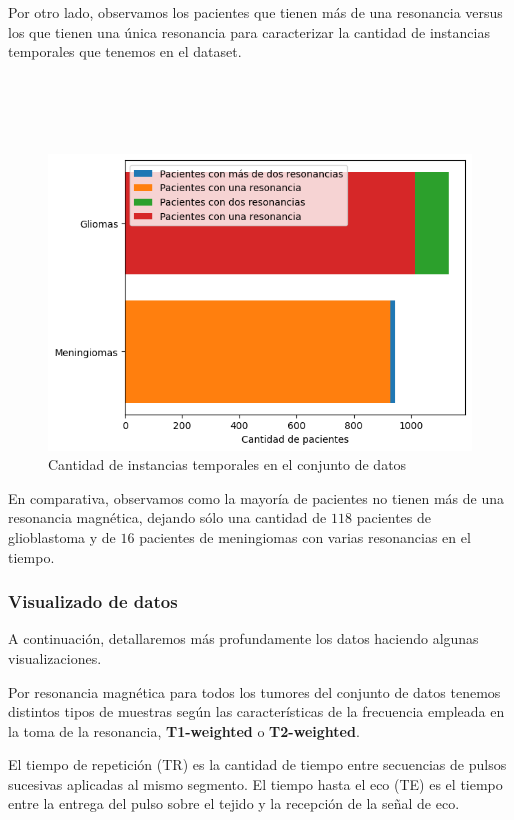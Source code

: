 Por otro lado, observamos los pacientes que tienen más de una resonancia versus los que tienen una única resonancia para caracterizar la cantidad de instancias temporales que tenemos en el dataset.
\\
\\
\\
\\
\\

\begin{figure}[!h]
	\centering
	\includegraphics[width=0.8\linewidth]{imagenes/cantidadinstanciastemporales.png}
	\caption{Cantidad de instancias temporales en el conjunto de datos}
\end{figure}

En comparativa, observamos como la mayoría de pacientes no tienen más de una resonancia magnética, dejando sólo una cantidad de $118$ pacientes de glioblastoma y de $16$ pacientes de meningiomas con varias resonancias en el tiempo.

\subsubsection{Visualizado de datos}

A continuación, detallaremos más profundamente los datos haciendo algunas visualizaciones. 

Por resonancia magnética para todos los tumores del conjunto de datos tenemos distintos tipos de muestras según las características de la frecuencia empleada en la toma de la resonancia, \textbf{T1-weighted} o \textbf{T2-weighted}. \cite{labella2023asnrmiccai}

El tiempo de repetición (TR) es la cantidad de tiempo entre secuencias de pulsos sucesivas aplicadas al mismo segmento. El tiempo hasta el eco (TE) es el tiempo entre la entrega del pulso sobre el tejido y la recepción de la señal de eco.

